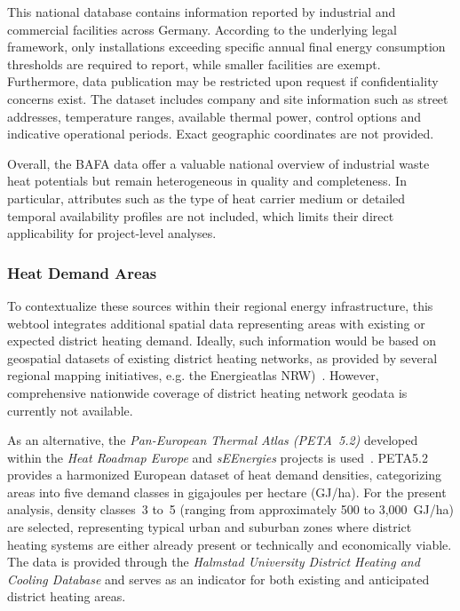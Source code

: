 \documentclass[letterpaper,11pt]{article}
\begin{document}
This national database contains information reported by industrial and commercial facilities across Germany. According to the underlying legal framework, only installations exceeding specific annual final energy consumption thresholds are required to report, while smaller facilities are exempt. Furthermore, data publication may be restricted upon request if confidentiality concerns exist. 
The dataset includes company and site information such as street addresses, temperature ranges, available thermal power, control options and indicative operational periods. Exact geographic coordinates are not provided.

Overall, the BAFA data offer a valuable national overview of industrial waste heat potentials but remain heterogeneous in quality and completeness. In particular, attributes such as the type of heat carrier medium or detailed temporal availability profiles are not included, which limits their direct applicability for project-level analyses.

\subsubsection{Heat Demand Areas}
To contextualize these sources within their regional energy infrastructure, this webtool integrates additional spatial data representing areas with existing or expected district heating demand. Ideally, such information would be based on geospatial datasets of existing district heating networks, as provided by several regional mapping initiatives, e.g. the Energieatlas NRW)~\cite{EnergieatlasNRW}. However, comprehensive nationwide coverage of district heating network geodata is currently not available.

As an alternative, the \textit{Pan-European Thermal Atlas (PETA~5.2)} developed within the \textit{Heat Roadmap Europe} and \textit{sEEnergies} projects is used~\cite{Moller.2018, Fleiter.2020, sEEnergiesOpenData}. PETA5.2 provides a harmonized European dataset of heat demand densities, categorizing areas into five demand classes in gigajoules per hectare (GJ/ha). For the present analysis, density classes~3 to~5 (ranging from approximately 500 to 3,000~GJ/ha) are selected, representing typical urban and suburban zones where district heating systems are either already present or technically and economically viable.
The data is provided through the \textit{Halmstad University District Heating and Cooling Database} and serves as an indicator for both existing and anticipated district heating areas.
\end{document}
